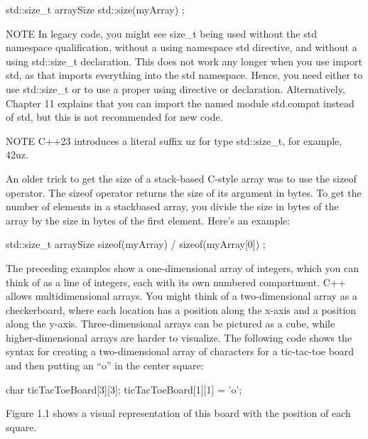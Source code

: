 \begin{cpp}
std::size_t arraySize { std::size(myArray) };
\end{cpp}

\begin{myNotic}{NOTE}
In legacy code, you might see size\_t being used without the std namespace qualification, without a using namespace std directive, and without a using std::size\_t declaration. This does not work any longer when you use import std, as that imports everything into the std namespace. Hence, you need either to use std::size\_t or to use a proper using directive or declaration. Alternatively, Chapter 11 explains that you can import the named module std.compat instead of std, but this is not recommended for new code.
\end{myNotic}


\begin{myNotic}{NOTE}
C++23 introduces a literal suffix uz for type std::size\_t, for example, 42uz.
\end{myNotic}

An older trick to get the size of a stack-based C-style array was to use the sizeof operator. The sizeof operator returns the size of its argument in bytes. To get the number of elements in a stackbased array, you divide the size in bytes of the array by the size in bytes of the first element. Here’s an example:

\begin{cpp}
std::size_t arraySize { sizeof(myArray) / sizeof(myArray[0]) };
\end{cpp}

The preceding examples show a one-dimensional array of integers, which you can think of as a line of integers, each with its own numbered compartment. C++ allows multidimensional arrays. You might think of a two-dimensional array as a checkerboard, where each location has a position along the x-axis and a position along the y-axis. Three-dimensional arrays can be pictured as a cube, while higher-dimensional arrays are harder to visualize. The following code shows the syntax for creating a two-dimensional array of characters for a tic-tac-toe board and then putting an “o” in the center square:

\begin{cpp}
char ticTacToeBoard[3][3];
ticTacToeBoard[1][1] = 'o';
\end{cpp}

Figure 1.1 shows a visual representation of this board with the position of each square.

